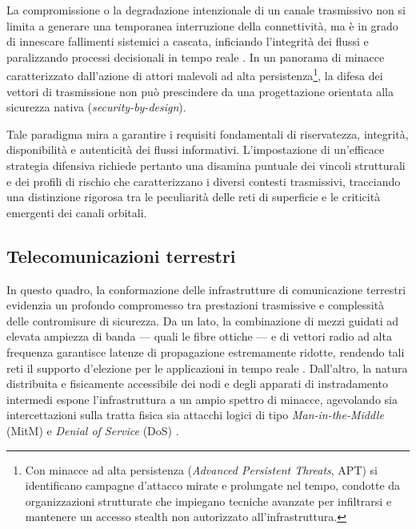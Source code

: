 La compromissione o la degradazione intenzionale di un canale trasmissivo non si limita a generare una temporanea interruzione della connettività, ma è in grado di innescare fallimenti sistemici a cascata, inficiando l'integrità dei flussi e paralizzando processi decisionali in tempo reale \cite{stallings2020}. 
In un panorama di minacce caratterizzato dall'azione di attori malevoli ad alta persistenza\footnote{Con minacce ad alta persistenza (\textit{Advanced Persistent Threats}, APT) si identificano campagne d'attacco mirate e prolungate nel tempo, condotte da organizzazioni strutturate che impiegano tecniche avanzate per infiltrarsi e mantenere un accesso stealth non autorizzato all'infrastruttura.}, la difesa dei vettori di trasmissione non può prescindere da una progettazione orientata alla sicurezza nativa (\textit{security-by-design}).

Tale paradigma mira a garantire i requisiti fondamentali di riservatezza, integrità, disponibilità e autenticità dei flussi informativi. 
L'impostazione di un'efficace strategia difensiva richiede pertanto una disamina puntuale dei vincoli strutturali e dei profili di rischio che caratterizzano i diversi contesti trasmissivi, tracciando una distinzione rigorosa tra le peculiarità delle reti di superficie e le criticità emergenti dei canali orbitali.

\subsection{Telecomunicazioni terrestri}
\label{subsec:telecomunicazioni_terrestri}

In questo quadro, la conformazione delle infrastrutture di comunicazione terrestri evidenzia un profondo compromesso tra prestazioni trasmissive e complessità delle contromisure di sicurezza. 
Da un lato, la combinazione di mezzi guidati ad elevata ampiezza di banda — quali le fibre ottiche — e di vettori radio ad alta frequenza garantisce latenze di propagazione estremamente ridotte, rendendo tali reti il supporto d'elezione per le applicazioni in tempo reale \cite{tanenbaum2020}. 
Dall'altro, la natura distribuita e fisicamente accessibile dei nodi e degli apparati di instradamento intermedi espone l'infrastruttura a un ampio spettro di minacce, agevolando sia intercettazioni sulla tratta fisica sia attacchi logici di tipo \textit{Man-in-the-Middle} (MitM) e \textit{Denial of Service} (DoS) \cite{stallings2020}.

